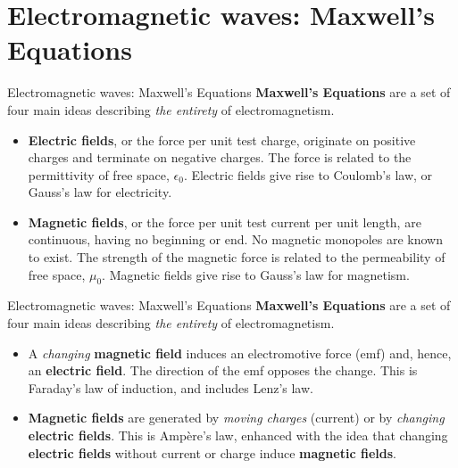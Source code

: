 \documentclass{beamer}
\begin{document}
\section{Electromagnetic waves: Maxwell's Equations}

\begin{frame}{Electromagnetic waves: Maxwell's Equations}
\textbf{\alert{Maxwell's Equations}} are a set of four main ideas describing \textit{the entirety} of electromagnetism.
\begin{itemize}
\item \textbf{Electric fields}, or the force per unit test charge, originate on positive charges and terminate on negative charges. The force is related to the permittivity of free space, $\epsilon_0$.  Electric fields give rise to Coulomb's law, or Gauss's law for electricity.
\item \textbf{Magnetic fields}, or the force per unit test current per unit length, are continuous, having no beginning or end. No magnetic monopoles are known to exist.  The strength of the magnetic force is related to the permeability of free space, $\mu_0$.  Magnetic fields give rise to Gauss's law for magnetism.
\end{itemize}
\end{frame}

\begin{frame}{Electromagnetic waves: Maxwell's Equations}
\textbf{\alert{Maxwell's Equations}} are a set of four main ideas describing \textit{the entirety} of electromagnetism.
\begin{itemize}
\item A \textit{changing} \textbf{magnetic field} induces an electromotive force (emf) and, hence, an \textbf{electric field}. The direction of the emf opposes the change.  This is Faraday's law of induction, and includes Lenz's law.
\item \textbf{Magnetic fields} are generated by \textit{moving charges} (current) or by \textit{changing} \textbf{electric fields}. This is Amp\`{e}re's law, enhanced with the idea that changing \textbf{electric fields} without current or charge induce \textbf{magnetic fields}.
\end{itemize}
\end{frame}
\end{document}
